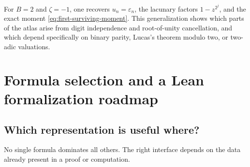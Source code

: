 \documentclass[11pt,oneside]{article}
\theoremstyle{definition}
\theoremstyle{remark}
\newcommand{\eps}{\varepsilon}
\begin{document}
For \(B=2\) and \(\zeta=-1\), one recovers \(u_n=\eps_n\), the lacunary factors
\(1-z^{2^j}\), and the exact moment \eqref{eq:first-surviving-moment}.  This generalization
shows which parts of the atlas arise from digit independence and root-of-unity cancellation,
and which depend specifically on binary parity, Lucas's theorem modulo two, or two-adic
valuations.

\section{Formula selection and a Lean formalization roadmap}
\label{sec:formalization}

\subsection{Which representation is useful where?}

No single formula dominates all others.  The right interface depends on the data already
present in a proof or computation.
\end{document}
